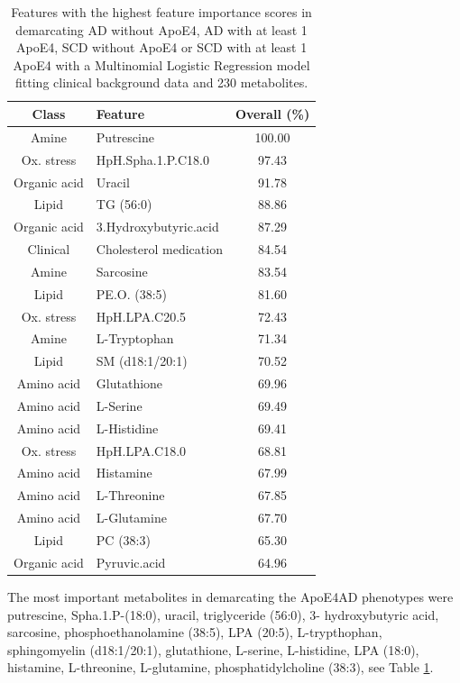 \documentclass{amsart}
\begin{document}
\begin{table}[H] 
	\centering
	\caption{\label{tab:fimp} Features with the highest feature importance scores in demarcating AD without ApoE4, AD with at least 1 ApoE4, SCD without ApoE4 or SCD with at least 1 ApoE4 with a Multinomial Logistic Regression model fitting clinical background data and 230 metabolites.}
	\begin{tabular}{clc}
		\toprule
      Class &	Feature & Overall (\%) \\ \midrule
    Amine & Putrescine            & 100.00 \\
    Ox. stress & HpH.Spha.1.P.C18.0    & 97.43  \\
    Organic acid & Uracil         & 91.78  \\
    Lipid & TG (56:0)             & 88.86  \\
    Organic acid & 3.Hydroxybutyric.acid & 87.29  \\
    Clinical &    Cholesterol medication   & 84.54  \\
    Amine & Sarcosine             & 83.54  \\
    Lipid & PE.O. (38:5)           & 81.60  \\
    Ox. stress & HpH.LPA.C20.5         & 72.43  \\
    Amine & L-Tryptophan          & 71.34  \\
    Lipid & SM (d18:1/20:1)       & 70.52  \\
    Amino acid & Glutathione           & 69.96  \\
    Amino acid & L-Serine              & 69.49  \\
    Amino acid & L-Histidine           & 69.41  \\
    Ox. stress & HpH.LPA.C18.0         & 68.81  \\
    Amino acid & Histamine             & 67.99  \\
    Amino acid & L-Threonine           & 67.85  \\
    Amino acid & L-Glutamine           & 67.70  \\
    Lipid & PC (38:3)             & 65.30  \\
    Organic acid & Pyruvic.acid          & 64.96 \\ \bottomrule
	\end{tabular}
\end{table}
The most important metabolites in demarcating the ApoE4AD phenotypes were putrescine, Spha.1.P-(18:0), uracil, triglyceride (56:0), 3- hydroxybutyric acid, sarcosine, phosphoethanolamine (38:5), LPA (20:5), L-trypthophan, sphingomyelin (d18:1/20:1), glutathione, L-serine, L-histidine, LPA (18:0), histamine, L-threonine, L-glutamine, phosphatidylcholine (38:3), see Table \ref{tab:fimp}. 
\end{document}
